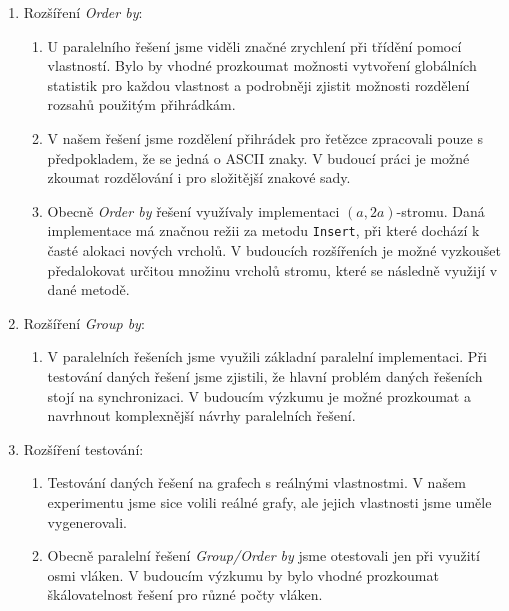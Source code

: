 \begin{enumerate}
\begin{enumerate}
\end{enumerate}

\item Rozšíření \textit{Order by}:
\begin{enumerate}

\item
U paralelního řešení jsme viděli značné zrychlení při třídění pomocí vlastností.
Bylo by vhodné prozkoumat možnosti vytvoření globálních statistik pro každou vlastnost a podrobněji zjistit možnosti rozdělení rozsahů použitým přihrádkám.
\item
V našem řešení jsme rozdělení přihrádek pro řetězce zpracovali pouze s předpokladem, že se jedná o ASCII znaky.
V budoucí práci je možné zkoumat rozdělování i pro složitější znakové sady.
\item
Obecně \textit{Order by} řešení využívaly implementaci $(a, 2a)$-stromu.
Daná implementace má značnou režii za metodu \texttt{Insert}, při které dochází k časté alokaci nových vrcholů.
V budoucích rozšířeních je možné vyzkoušet předalokovat určitou množinu vrcholů stromu, které se následně využijí v dané metodě.
\end{enumerate}

\item Rozšíření \textit{Group by}:
\begin{enumerate}

\item
V paralelních řešeních jsme využili základní paralelní implementaci.
Při testování daných řešení jsme zjistili, že hlavní problém daných řešeních stojí na synchronizaci.
V budoucím výzkumu je možné prozkoumat a navrhnout komplexnější návrhy paralelních řešení.

\end{enumerate}


\item Rozšíření testování:
\begin{enumerate}

\item Testování daných řešení na grafech s reálnými vlastnostmi.
V našem experimentu jsme sice volili reálné grafy, ale jejich vlastnosti jsme uměle vygenerovali.

\item
Obecně paralelní řešení \textit{Group/Order by} jsme otestovali jen při využití osmi vláken.
V budoucím výzkumu by bylo vhodné prozkoumat škálovatelnost řešení pro různé počty vláken.


\end{enumerate}
\end{enumerate}
